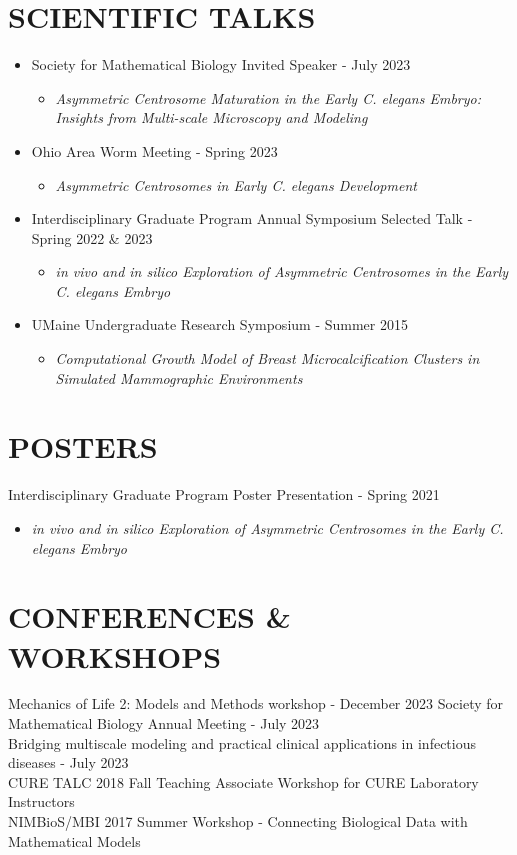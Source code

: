 \documentclass[10pt]{res} %
\begin{document}
\begin{resume}
\section{SCIENTIFIC TALKS}
    \begin{itemize}[leftmargin=0pt]
        \item[] Society for Mathematical Biology Invited Speaker - July 2023
        \begin{itemize}
            \item[] {\it Asymmetric Centrosome Maturation in the Early C. elegans Embryo: Insights from Multi-scale Microscopy and Modeling}
        \end{itemize}
        \item[] Ohio Area Worm Meeting - Spring 2023
        \begin{itemize}
            \item[] {\it Asymmetric Centrosomes in Early C. elegans Development}
        \end{itemize}
        \item[] Interdisciplinary Graduate Program Annual Symposium Selected Talk - Spring 2022 \& 2023 
        \begin{itemize}
            \item[] {\it in vivo and in silico Exploration of Asymmetric Centrosomes in the Early C. elegans Embryo}
        \end{itemize}
        \item[] UMaine Undergraduate Research Symposium - Summer 2015
        \begin{itemize}
            \item[] {\it Computational Growth Model of Breast Microcalcification Clusters in Simulated Mammographic Environments}
        \end{itemize}
\end{itemize}
            
\section{POSTERS}
    Interdisciplinary Graduate Program Poster Presentation -  Spring 2021
    \begin{itemize}
            \item[] {\it in vivo and in silico Exploration of Asymmetric Centrosomes in the Early C. elegans Embryo}
        \end{itemize}            
\section{CONFERENCES \& WORKSHOPS }
    Mechanics of Life 2: Models and Methods workshop - December 2023
    Society for Mathematical Biology Annual Meeting - July 2023\\
    Bridging multiscale modeling and practical clinical applications in infectious diseases - July 2023\\
    CURE TALC 2018 Fall Teaching Associate Workshop for CURE Laboratory Instructors\\
	NIMBioS/MBI 2017 Summer Workshop - Connecting Biological Data with Mathematical Models


\end{resume}
\end{document}
